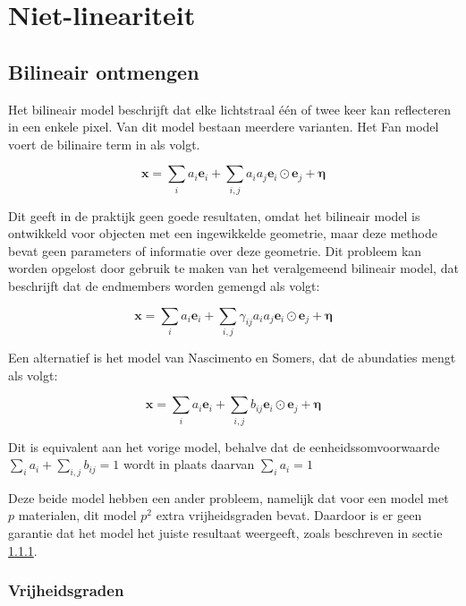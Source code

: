 \documentclass[12pt]{report}
\begin{document}
\chapter{Niet-lineariteit\cite{mlinmix}}


\section{Bilineair ontmengen}

Het bilineair model beschrijft dat elke lichtstraal \'e\'en of twee keer kan reflecteren in een enkele pixel. Van dit model bestaan meerdere varianten. Het Fan model\cite{mlinmix} voert de bilinaire term in als volgt.

\begin{equation}
\bm{x} = \sum_i a_i \bm{e}_i + \sum_{i,j} a_i a_j \bm{e}_i \odot \bm{e}_j + \bm{\eta}
\end{equation}

Dit geeft in de praktijk geen goede resultaten, omdat het bilineair model is ontwikkeld voor objecten met een ingewikkelde geometrie, maar deze methode bevat geen parameters of informatie over deze geometrie. Dit probleem kan worden opgelost door gebruik te maken van het veralgemeend bilineair model\cite{mlinmix}, dat beschrijft dat de endmembers worden gemengd als volgt:

\begin{equation}
\bm{x} = \sum_i a_i \bm{e}_i + \sum_{i,j}  \gamma_{ij} a_i a_j \bm{e}_i \odot \bm{e}_j + \bm{\eta}
\end{equation}

Een alternatief is het model van Nascimento en Somers, dat de abundaties mengt als volgt:

\begin{equation}
\bm{x} = \sum_i a_i \bm{e}_i + \sum_{i,j}  b_{ij} \bm{e}_i \odot \bm{e}_j + \bm{\eta}
\end{equation}

Dit is equivalent aan het vorige model, behalve dat de eenheidssomvoorwaarde $\sum_i a_i + \sum_{i,j} b_{ij} = 1$ wordt in plaats daarvan $\sum_i a_i = 1$

Deze beide model hebben een ander probleem, namelijk dat voor een model met $p$ materialen, dit model $p^2$ extra vrijheidsgraden bevat. Daardoor is er geen garantie dat het model het juiste resultaat weergeeft, zoals beschreven in sectie \ref{sec:vrij}. 



\subsection{Vrijheidsgraden} \label{sec:vrij}
\end{document}
